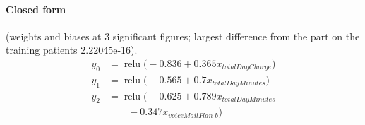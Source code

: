 \documentclass[a4paper,10pt]{article}
\newif\ifreviewmarks
\newcommand{\reviewrule}{\noindent{\color{BrickRed}\rule{\linewidth}{0.8pt}}}
\newenvironment{drafted}[1][]{%
  \ifreviewmarks\par\addvspace{\medskipamount}\reviewrule\par\nopagebreak
  \noindent{\color{BrickRed}\sffamily\footnotesize\textbf{Thesis Draft}\quad #1\hfill review}\par\nopagebreak\smallskip\fi}{%
  \ifreviewmarks\par\smallskip\noindent{\color{BrickRed}\sffamily\footnotesize end of thesis draft}\par\nopagebreak\reviewrule\par\medskip\fi}
\begin{document}
\begin{drafted}[plain-language layer: churn100-s4-c3]
\paragraph{Closed form} {\footnotesize(weights and biases at 3 significant figures; largest difference from the part on the training patients 2.22045e-16).}
{\small\begingroup\allowdisplaybreaks
\begin{align*}
y_{0} &= \operatorname{relu}\bigl(-0.836 + 0.365 x_{totalDayCharge}\bigr) \\
y_{1} &= \operatorname{relu}\bigl(-0.565 + 0.7 x_{totalDayMinutes}\bigr) \\
y_{2} &= \operatorname{relu}\bigl(-0.625 + 0.789 x_{totalDayMinutes} \\
&\qquad - 0.347 x_{voiceMailPlan\_b}\bigr)
\end{align*}\endgroup}


\end{drafted}
\end{document}
